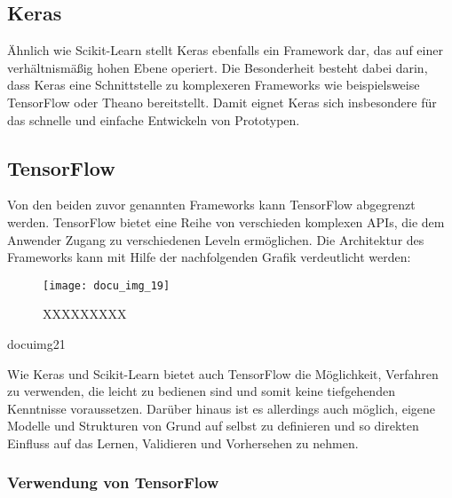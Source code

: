 \subsection{Keras}

Ähnlich wie Scikit-Learn stellt Keras ebenfalls ein Framework dar, das auf einer verhältnismäßig hohen Ebene operiert.
Die Besonderheit besteht dabei darin, dass Keras eine Schnittstelle zu komplexeren Frameworks wie beispielsweise
TensorFlow oder Theano bereitstellt. Damit eignet Keras sich insbesondere für das schnelle und einfache Entwickeln von
Prototypen.

\subsection{TensorFlow}

Von den beiden zuvor genannten Frameworks kann TensorFlow abgegrenzt werden. TensorFlow bietet eine Reihe von
verschieden komplexen APIs, die dem Anwender Zugang zu verschiedenen Leveln ermöglichen. Die Architektur des Frameworks
kann mit Hilfe der nachfolgenden Grafik verdeutlicht werden:

\begin{figure}[h]
    \centering
    \texttt{[image: docu\_img\_19]}
    \caption{XXXXXXXXX}
    \label{fig:foo}
\end{figure}
docuimg21

Wie Keras und Scikit-Learn bietet auch TensorFlow die Möglichkeit, Verfahren zu verwenden, die leicht zu bedienen sind
und somit keine tiefgehenden Kenntnisse voraussetzen. Darüber hinaus ist es allerdings auch möglich, eigene Modelle und
Strukturen von Grund auf selbst zu definieren und so direkten Einfluss auf das Lernen, Validieren und Vorhersehen zu
nehmen.

\subsubsection{Verwendung von TensorFlow}
